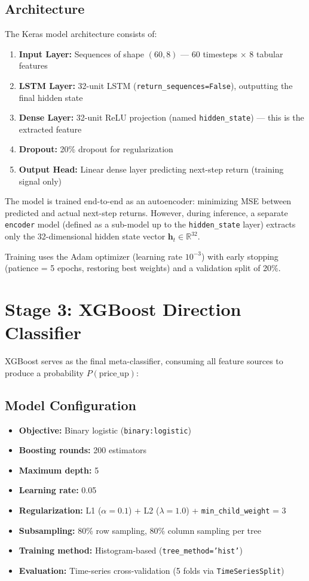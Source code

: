 \documentclass[letterpaper,11pt]{report}
\begin{document}
\subsection{Architecture}

The Keras model architecture consists of:
\begin{enumerate}
    \item \textbf{Input Layer:} Sequences of shape $(60, 8)$ --- 60 timesteps $\times$ 8 tabular features
    \item \textbf{LSTM Layer:} 32-unit LSTM (\texttt{return\_sequences=False}), outputting the final hidden state
    \item \textbf{Dense Layer:} 32-unit ReLU projection (named \texttt{hidden\_state}) --- this is the extracted feature
    \item \textbf{Dropout:} 20\% dropout for regularization
    \item \textbf{Output Head:} Linear dense layer predicting next-step return (training signal only)
\end{enumerate}

The model is trained end-to-end as an autoencoder: minimizing MSE between predicted and actual next-step returns. However, during inference, a separate \texttt{encoder} model (defined as a sub-model up to the \texttt{hidden\_state} layer) extracts only the 32-dimensional hidden state vector $\mathbf{h}_t \in \mathbb{R}^{32}$.

Training uses the Adam optimizer (learning rate $10^{-3}$) with early stopping (patience = 5 epochs, restoring best weights) and a validation split of 20\%.

\section{Stage 3: XGBoost Direction Classifier}

XGBoost serves as the final meta-classifier, consuming all feature sources to produce a probability $P(\text{price\_up})$:

\subsection{Model Configuration}
\begin{itemize}
    \item \textbf{Objective:} Binary logistic (\texttt{binary:logistic})
    \item \textbf{Boosting rounds:} 200 estimators
    \item \textbf{Maximum depth:} 5
    \item \textbf{Learning rate:} 0.05
    \item \textbf{Regularization:} L1 ($\alpha = 0.1$) + L2 ($\lambda = 1.0$) + \texttt{min\_child\_weight} = 3
    \item \textbf{Subsampling:} 80\% row sampling, 80\% column sampling per tree
    \item \textbf{Training method:} Histogram-based (\texttt{tree\_method='hist'})
    \item \textbf{Evaluation:} Time-series cross-validation (5 folds via \texttt{TimeSeriesSplit})
\end{itemize}
\end{document}
